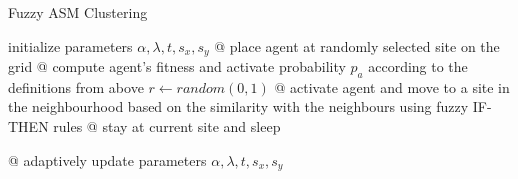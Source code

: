 \begin{algorithm}
\caption{Fuzzy ASM Clustering}
\label{alg:fuzzyasmclustering}
\begin{algorithmic}[1]
\STATE initialize parameters  $\alpha, \lambda, t, s_x, s_y$
	\STATE @ place agent at randomly selected site on the grid
\ENDFOR
{}
		\STATE @ compute agent’s fitness and activate probability $p_a$ according
						to the definitions from above
		\STATE $r \leftarrow random (0,1)$
			\STATE @ activate agent and move to a site in the neighbourhood based on the similarity with the neighbours using fuzzy IF-THEN rules
		\ELSE
			\STATE @ stay at current site and sleep
		\ENDIF 

	\ENDFOR
	\STATE @ adaptively update parameters $\alpha, \lambda, t, s_x, s_y  $
\ENDWHILE
\end{algorithmic}
\end{algorithm}
